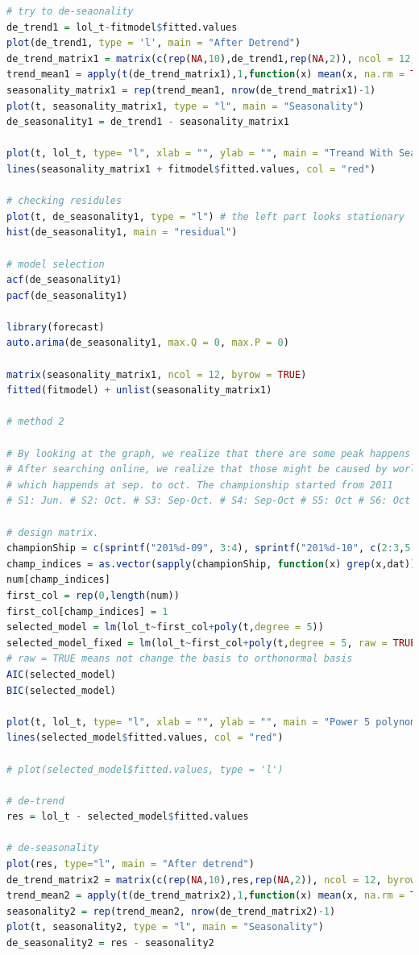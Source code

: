 \documentclass[11pt,a4paper]{article}
\begin{document}
\begin{itemize}
\begin{lstlisting}[language=R]
# try to de-seaonality
de_trend1 = lol_t-fitmodel$fitted.values
plot(de_trend1, type = 'l', main = "After Detrend")
de_trend_matrix1 = matrix(c(rep(NA,10),de_trend1,rep(NA,2)), ncol = 12, byrow = TRUE)
trend_mean1 = apply(t(de_trend_matrix1),1,function(x) mean(x, na.rm = TRUE))
seasonality_matrix1 = rep(trend_mean1, nrow(de_trend_matrix1)-1)
plot(t, seasonality_matrix1, type = "l", main = "Seasonality")
de_seasonality1 = de_trend1 - seasonality_matrix1

plot(t, lol_t, type= "l", xlab = "", ylab = "", main = "Treand With Seasonality")
lines(seasonality_matrix1 + fitmodel$fitted.values, col = "red")

# checking residules
plot(t, de_seasonality1, type = "l") # the left part looks stationary
hist(de_seasonality1, main = "residual")

# model selection
acf(de_seasonality1)
pacf(de_seasonality1)

library(forecast)
auto.arima(de_seasonality1, max.Q = 0, max.P = 0)

matrix(seasonality_matrix1, ncol = 12, byrow = TRUE)
fitted(fitmodel) + unlist(seasonality_matrix1)

# method 2

# By looking at the graph, we realize that there are some peak happens seasonally.
# After searching online, we realize that those might be caused by world championship
# which happends at sep. to oct. The championship started from 2011
# S1: Jun. # S2: Oct. # S3: Sep-Oct. # S4: Sep-Oct # S5: Oct # S6: Oct # S7: Oct

# design matrix.
championShip = c(sprintf("201%d-09", 3:4), sprintf("201%d-10", c(2:3,5:6)))
champ_indices = as.vector(sapply(championShip, function(x) grep(x,dat)))
num[champ_indices]
first_col = rep(0,length(num))
first_col[champ_indices] = 1
selected_model = lm(lol_t~first_col+poly(t,degree = 5))
selected_model_fixed = lm(lol_t~first_col+poly(t,degree = 5, raw = TRUE)) 
# raw = TRUE means not change the basis to orthonormal basis
AIC(selected_model)
BIC(selected_model)

plot(t, lol_t, type= "l", xlab = "", ylab = "", main = "Power 5 polynomial fitting with separeted spikes")
lines(selected_model$fitted.values, col = "red")

# plot(selected_model$fitted.values, type = 'l')

# de-trend
res = lol_t - selected_model$fitted.values

# de-seasonality
plot(res, type="l", main = "After detrend")
de_trend_matrix2 = matrix(c(rep(NA,10),res,rep(NA,2)), ncol = 12, byrow = TRUE)
trend_mean2 = apply(t(de_trend_matrix2),1,function(x) mean(x, na.rm = TRUE))
seasonality2 = rep(trend_mean2, nrow(de_trend_matrix2)-1)
plot(t, seasonality2, type = "l", main = "Seasonality")
de_seasonality2 = res - seasonality2


\end{lstlisting}
\end{itemize}
\end{document}
